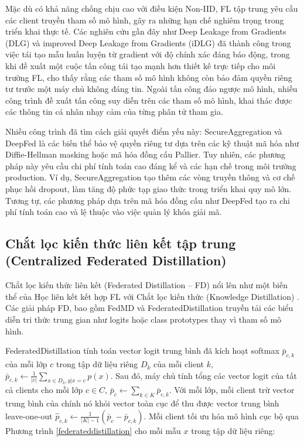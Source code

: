 Mặc dù có khả năng chống chịu cao với điều kiện Non-IID, FL tập trung yêu cầu các client truyền tham số mô hình, gây ra những hạn chế nghiêm trọng trong triển khai thực tế. Các nghiên cứu gần đây như Deep Leakage from Gradients (DLG) \cite{zhu2019dlg} và improved Deep Leakage from Gradients (iDLG) \cite{zhao2020idlg} đã thành công trong việc tái tạo mẫu huấn luyện từ gradient với độ chính xác đáng báo động, trong khi \cite{geiping2020inverting} đề xuất một cuộc tấn công tái tạo mạnh hơn thiết kế trực tiếp cho môi trường FL, cho thấy rằng các tham số mô hình không còn bảo đảm quyền riêng tư trước một máy chủ không đáng tin. Ngoài tấn công đảo ngược mô hình, nhiều công trình đề xuất tấn công suy diễn \cite{pyrgelis2017knockknock, melis2019mia, ganju2018inference} trên các tham số mô hình, khai thác được các thông tin cá nhân nhạy cảm của từng phân tử tham gia.

Nhiều công trình đã tìm cách giải quyết điểm yếu này: SecureAggregation \cite{bonawitz2016secagg} và DeepFed \cite{li2020deepfed} là các biến thể bảo vệ quyền riêng tư dựa trên các kỹ thuật mã hóa như Diffie-Hellman masking hoặc mã hóa đồng cấu Pallier. Tuy nhiên, các phương pháp này yêu cầu chi phí tính toán cao đáng kể và các hạn chế trong môi trường production. Ví dụ, SecureAggregation tạo thêm các vòng truyền thông và cơ chế phục hồi dropout, làm tăng độ phức tạp giao thức trong triển khai quy mô lớn. Tương tự, các phương pháp dựa trên mã hóa đồng cấu như DeepFed tạo ra chi phí tính toán cao và lệ thuộc vào việc quản lý khóa giải mã.

\subsection{Chắt lọc kiến thức liên kết tập trung (Centralized Federated Distillation)}
\label{sec:fd}
Chắt lọc kiến thức liên kết (Federated Distillation -- FD) \cite{li2019fedmd, tan2022fedproto, jeong2018federateddistillation} nổi lên như một biến thể của Học liên kết kết hợp FL với Chắt lọc kiến thức (Knowledge Distillation) \cite{hinton2015kd}. Các giải pháp FD, bao gồm FedMD \cite{li2019fedmd} và FederatedDistillation \cite{jeong2018federateddistillation} truyền tải các biểu diễn tri thức trung gian như logits hoặc class prototypes \cite{tan2022fedproto} thay vì tham số mô hình.

FederatedDistillation tính toán vector logit trung bình đã kích hoạt softmax $\bar{p}_{c,k}$ của mỗi lớp $c$ trong tập dữ liệu riêng $D_k$ của mỗi client $k$, $\bar{p}_{c,k} \leftarrow \frac{1}{|c|}\sum_{x \in D_k, y|x = c}p(x)$. Sau đó, máy chủ tính tổng các vector logit của tất cả clients cho mỗi lớp $c \in C$, $\bar{p}_c \leftarrow \sum_{k \in K}\bar{p}_{c,k}$. Với mỗi lớp, mỗi client trừ vector trung bình của chính nó khỏi vector toàn cục để thu được vector trung bình leave-one-out $\hat{p}_{c,k} \leftarrow \frac{1}{|K|-1} (\bar{p}_c - \bar{p}_{c,k})$. Mỗi client tối ưu hóa mô hình cục bộ qua Phương trình \ref{federateddistillation} cho mỗi mẫu $x$ trong tập dữ liệu riêng:

